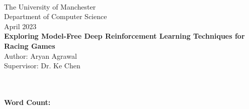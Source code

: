 \documentclass[12pt]{report}
\theoremstyle{definition}
\begin{document}
\thispagestyle{empty}
\begin{center}
  \large
   \\
  \vspace*{0.4in}
  The University of Manchester \\
  Department of Computer Science \\
  April 2023 \\
  \vspace*{0.2in}
  \textbf{\LARGE{Exploring Model-Free Deep Reinforcement Learning Techniques for Racing Games}} \\
  \vspace*{0.2in}
  Author: Aryan Agrawal \\
  \vspace*{0.2in}
  Supervisor: Dr. Ke Chen
\end{center}
\begin{abstract}
  \begin{quotation}
    
  \end{quotation}
\end{abstract}
\renewcommand{\abstractname}{Acknowledgements}
\begin{abstract}
  \begin{quotation}
    
  \end{quotation}
\end{abstract}
\tableofcontents
~\\~\\
\textbf{Word Count: }
\listoffigures
\listoftables
\listofalgorithms
\lstlistoflistings





\printbibliography[notkeyword={fig}, heading=bibintoc, title={References}]
\printbibliography[keyword={fig}, heading=bibintoc, title={References for Figures}]
\appendix

\end{document}
